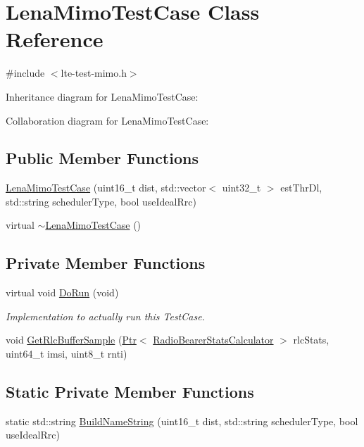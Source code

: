 \hypertarget{classLenaMimoTestCase}{}\section{Lena\+Mimo\+Test\+Case Class Reference}
\label{classLenaMimoTestCase}


{\ttfamily \#include $<$lte-\/test-\/mimo.\+h$>$}



Inheritance diagram for Lena\+Mimo\+Test\+Case\+:


Collaboration diagram for Lena\+Mimo\+Test\+Case\+:
\subsection*{Public Member Functions}
\begin{DoxyCompactItemize}
\item 
\hyperlink{classLenaMimoTestCase_a4764812b6d294b2206dfb6de33b4b4bf}{Lena\+Mimo\+Test\+Case} (uint16\+\_\+t dist, std\+::vector$<$ uint32\+\_\+t $>$ est\+Thr\+Dl, std\+::string scheduler\+Type, bool use\+Ideal\+Rrc)
\item 
virtual \hyperlink{classLenaMimoTestCase_a9db7f447484dc17626ba00ef9e722f7c}{$\sim$\+Lena\+Mimo\+Test\+Case} ()
\end{DoxyCompactItemize}
\subsection*{Private Member Functions}
\begin{DoxyCompactItemize}
\item 
virtual void \hyperlink{classLenaMimoTestCase_a5479f5cb1621e84f8d28b4779f3e3b7c}{Do\+Run} (void)
\begin{DoxyCompactList}\small\item\em Implementation to actually run this Test\+Case. \end{DoxyCompactList}\item 
void \hyperlink{classLenaMimoTestCase_a43eedcc3fd861f523d97d7c04ca2b9f8}{Get\+Rlc\+Buffer\+Sample} (\hyperlink{classns3_1_1Ptr}{Ptr}$<$ \hyperlink{classns3_1_1RadioBearerStatsCalculator}{Radio\+Bearer\+Stats\+Calculator} $>$ rlc\+Stats, uint64\+\_\+t imsi, uint8\+\_\+t rnti)
\end{DoxyCompactItemize}
\subsection*{Static Private Member Functions}
\begin{DoxyCompactItemize}
\item 
static std\+::string \hyperlink{classLenaMimoTestCase_ae6d3c99db6456c54917700e2019b37dd}{Build\+Name\+String} (uint16\+\_\+t dist, std\+::string scheduler\+Type, bool use\+Ideal\+Rrc)
\end{DoxyCompactItemize}
